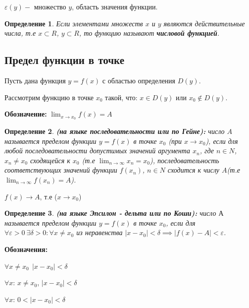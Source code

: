 \documentclass[12pt, a4paper]{article}
\newtheorem{definition}{Определение}[subsection]
\theoremstyle{remark}
\newcommand{\Y}{\mathbb{\forall}}
\newcommand{\F}{\mathbb{\exists}}
\newcommand{\E}{\mathbb{\varepsilon}}
\begin{document}
	$\E(y) - $ множество $y$, область значения функции. 
	
	\begin{definition}
		Если элементами множеств $x$ и $y$ являются действительные числа, т.е $x \subset R$, $y \subset R$, то функцию называют \textbf{числовой функцией}.
	\end{definition}
	
	\subsection{Предел функции в точке}
	
	Пусть дана функция $y = f(x)$ с областью определения $D(y)$.
	\vspace{0.4cm}
	
	\noindent Рассмотрим функцию в точке $x_0$ такой, что: $x \in D(y)$ или $x_0 \notin D(y)$.
	\vspace{0.4cm}
	
	\textbf{Обозначение:} \(\lim_{x \to x_0} f(x) = A\)
	
	\begin{definition}
		\textbf{(на языке последовательности или по Гейне):} число $A$ называется пределом функции $y = f(x)$ в точке $x_0$ (при $x \to x_0$), если для любой последовательности допустимых значений аргумента $x_n$, где $n \in N$, $x_n \neq x_0$ сходящейся к $x_0$ (т.е \(\lim_{n \to \infty} x_n = x_0\)), последовательность соответствующих значений функции $f(x_n)$, $n \in N$ сходится к числу $A$(т.е $\lim_{n \to \infty} f(x_n) = A$).
	\end{definition}
	
	$f(x) \to A$, т.е (\(x \to x_0\))
	
	\begin{definition}
		\textbf{(на языке Эпсилон - дельта или по Коши):} число $А$ называется пределом функции $y = f(x)$ в точке $x_0$, если для $\Y\E > 0 \ \F\delta > 0: \Y x \neq x_0$ из неравенства $|x - x_0| < \delta \implies |f(x) - A| < \E$.
	\end{definition}
	
	\textbf{Обозначения:} 
	
	\(\Y x \neq x_0 \ \ |x - x_0| < \delta\)
	\vspace{0.2cm}
	
	\(\Y x\): $x \neq x_0$, $|x - x_0| < \delta$ 	
	\vspace{0.2cm}
	
	\(\Y x\): \(0 < |x - x_0| < \delta\)
	\vspace{0.4cm}
	
\end{document}
